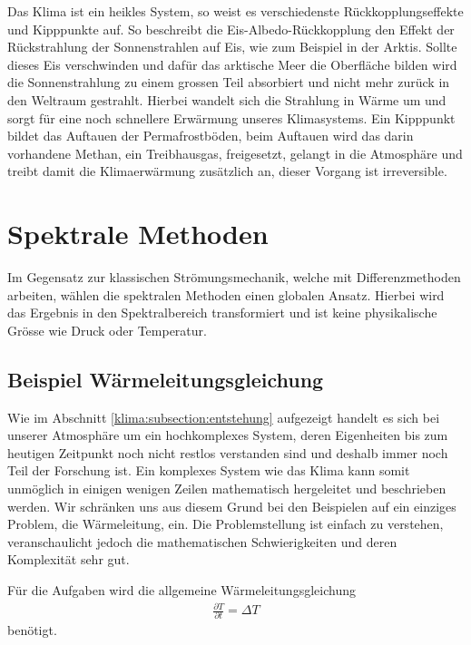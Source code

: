 \begin{refsection}
Das Klima ist ein heikles System, so weist es verschiedenste
Rückkopplungseffekte und Kipppunkte auf. So beschreibt die
Eis-Albedo-Rückkopplung den Effekt der Rückstrahlung der Sonnenstrahlen
auf Eis, wie zum Beispiel in der Arktis. Sollte dieses Eis verschwinden
und dafür das arktische Meer die Oberfläche bilden wird die
Sonnenstrahlung zu einem grossen Teil absorbiert und nicht mehr
zurück in den Weltraum gestrahlt. Hierbei wandelt sich die Strahlung
in Wärme um und sorgt für eine noch schnellere Erwärmung unseres
Klimasystems. Ein Kipppunkt bildet das Auftauen der Permafrostböden,
beim Auftauen wird das darin vorhandene Methan, ein Treibhausgas,
freigesetzt, gelangt in die Atmosphäre und treibt damit die
Klimaerwärmung zusätzlich an, dieser Vorgang ist irreversible.

\section{Spektrale Methoden
\label{klima:section:spektrale}}
Im Gegensatz zur klassischen Strömungsmechanik, welche mit Differenzmethoden arbeiten, wählen die spektralen Methoden einen globalen Ansatz. Hierbei wird das Ergebnis in den Spektralbereich transformiert und ist keine physikalische Grösse wie Druck oder Temperatur.

\subsection{Beispiel Wärmeleitungsgleichung}
Wie im Abschnitt \ref{klima:subsection:entstehung}
 aufgezeigt handelt es sich
bei unserer Atmosphäre um ein hochkomplexes System, deren Eigenheiten
bis zum heutigen Zeitpunkt noch nicht restlos verstanden sind und
deshalb immer noch Teil der Forschung ist. Ein komplexes System wie
das Klima kann somit unmöglich in einigen wenigen Zeilen mathematisch
hergeleitet und beschrieben werden. Wir schränken uns aus diesem
Grund bei den Beispielen auf ein einziges Problem, die Wärmeleitung,
ein. Die Problemstellung ist einfach zu verstehen, veranschaulicht
jedoch die mathematischen Schwierigkeiten und deren Komplexität
sehr gut.

Für die Aufgaben wird die allgemeine Wärmeleitungsgleichung
%
\begin{align}
\frac{\partial T}{\partial t} = \Delta T
\label{klima:bsp:pdgl}
\end{align}
benötigt.


\end{refsection}
